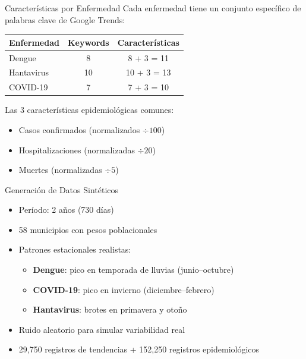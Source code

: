 \documentclass[10pt]{beamer}
\begin{document}
\begin{frame}{Características por Enfermedad}
  Cada enfermedad tiene un conjunto específico de palabras clave de Google Trends:
  
  \begin{table}
    \centering
    \begin{tabular}{lcc}
      \toprule
      \textbf{Enfermedad} & \textbf{Keywords} & \textbf{Características} \\
      \midrule
      Dengue & 8 & 8 + 3 = 11 \\
      Hantavirus & 10 & 10 + 3 = 13 \\
      COVID-19 & 7 & 7 + 3 = 10 \\
      \bottomrule
    \end{tabular}
  \end{table}
  
  Las 3 características epidemiológicas comunes:
  \begin{itemize}
    \item Casos confirmados (normalizados $\div 100$)
    \item Hospitalizaciones (normalizadas $\div 20$)
    \item Muertes (normalizadas $\div 5$)
  \end{itemize}
\end{frame}

\begin{frame}{Generación de Datos Sintéticos}
  \begin{itemize}
    \item Período: 2 años (730 días)
    \item 58 municipios con pesos poblacionales
    \item Patrones estacionales realistas:
      \begin{itemize}
        \item \textbf{Dengue}: pico en temporada de lluvias (junio--octubre)
        \item \textbf{COVID-19}: pico en invierno (diciembre--febrero)
        \item \textbf{Hantavirus}: brotes en primavera y otoño
      \end{itemize}
    \item Ruido aleatorio para simular variabilidad real
    \item 29,750 registros de tendencias + 152,250 registros epidemiológicos
  \end{itemize}
\end{frame}
\end{document}
